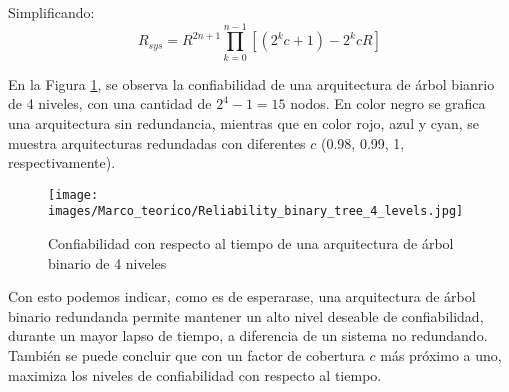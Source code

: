 Simplificando: $$R_{sys} = R^{2n +1} \prod_{k=0}^{n-1}{[(2^kc+1) - 2^kcR]}$$

En la Figura \ref{fig:Reliability_binary_tree_4_levels}, se observa la confiabilidad de una 
arquitectura de árbol bianrio de 4 niveles, con una cantidad de $2^4 -1 = 15$ nodos. En color negro 
se grafica una arquitectura sin redundancia, mientras que en color rojo, azul y cyan, se muestra 
arquitecturas redundadas con diferentes $c$ (0.98, 0.99, 1, respectivamente). 

\begin{figure}[h]
 \centering
 \texttt{[image: images/Marco\_teorico/Reliability\_binary\_tree\_4\_levels.jpg]}
  \caption{Confiabilidad con respecto al tiempo de una arquitectura de árbol binario de 4 niveles}  
\label{fig:Reliability_binary_tree_4_levels} 
\end{figure}

Con esto podemos indicar, como es de esperarase, una arquitectura de árbol binario redundanda 
permite mantener un alto nivel deseable de confiabilidad, durante un mayor lapso de tiempo, a 
diferencia de un sistema no redundando. También se puede concluir que con un factor de cobertura $c$
más próximo a uno, maximiza los niveles de confiabilidad con respecto al tiempo. 


